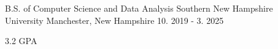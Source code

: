 

\begin{cventries}
	
	\cventry
	{B.S. of Computer Science and Data Analysis} %
	{Southern New Hampshire University} %
	{Manchester, New Hampshire} %
	{10. 2019 - 3. 2025} %
	{
		\begin{cvitems} %
			\item 3.2 GPA
		\end{cvitems}
	}
	
\end{cventries}
